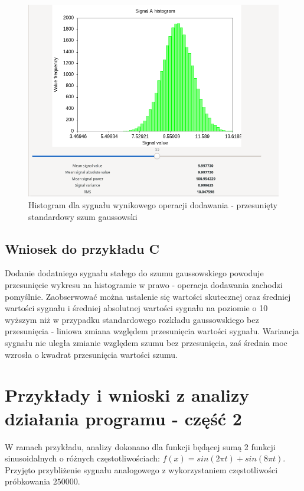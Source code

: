 \documentclass{article}
\begin{document}
\newpage
\begin{figure}[h!]
 \centering
 \includegraphics[width=14cm]{shifted_gauss_hist.png}
 \vspace{-0.3cm}
 \caption{Histogram dla sygnału wynikowego operacji dodawania - przesunięty standardowy szum gaussowski}
 \label{fig:shifted_gauss_hist}
\end{figure}
\newpage
\subsection{Wniosek do przykładu C}
Dodanie dodatniego sygnału stałego do szumu gaussowskiego powoduje przesunięcie wykresu na histogramie w prawo - operacja dodawania zachodzi pomyślnie. Zaobserwować można ustalenie się wartości skutecznej oraz średniej wartości sygnału i średniej absolutnej wartości sygnału na poziomie o 10 wyższym niż w przypadku standardowego rozkładu gaussowskiego bez przesunięcia - liniowa zmiana względem przesunięcia wartości sygnału. Wariancja sygnału nie uległa zmianie względem szumu bez przesunięcia, zaś średnia moc wzrosła o kwadrat przesunięcia wartości szumu.

\section{Przykłady i wnioski z analizy działania programu - część 2}
W ramach przykładu, analizy dokonano dla funkcji będącej sumą 2 funkcji sinusoidalnych o różnych częstotliwościach: $f(x) = sin(2\pi t) + sin(8\pi t)$. Przyjęto przybliżenie sygnału analogowego z wykorzystaniem częstotliwości próbkowania $250000$.
\end{document}
